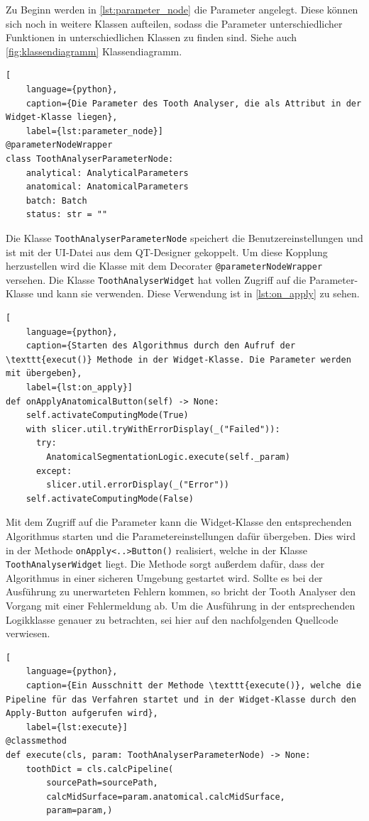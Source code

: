 Zu Beginn werden in \ref{lst:parameter_node} die Parameter angelegt. Diese können
sich noch in weitere Klassen aufteilen, sodass die Parameter unterschiedlicher
Funktionen in unterschiedlichen Klassen zu finden sind. Siehe auch \ref{fig:klassendiagramm}
Klassendiagramm.

\begin{lstlisting}[
    language={python},
    caption={Die Parameter des Tooth Analyser, die als Attribut in der Widget-Klasse liegen},
    label={lst:parameter_node}]
@parameterNodeWrapper
class ToothAnalyserParameterNode:
    analytical: AnalyticalParameters
    anatomical: AnatomicalParameters
    batch: Batch
    status: str = ""
\end{lstlisting}

Die Klasse \texttt{ToothAnalyserParameterNode} speichert die Benutzereinstellungen
und ist mit der \ac{UI}-Datei aus dem QT-Designer gekoppelt. Um diese Kopplung herzustellen
wird die Klasse mit dem Decorater \texttt{@parameterNodeWrapper} versehen. Die Klasse
\texttt{ToothAnalyserWidget} hat vollen Zugriff auf die Parameter-Klasse und
kann sie verwenden. Diese Verwendung ist in \ref{lst:on_apply} zu sehen.

\begin{lstlisting}[
    language={python},
    caption={Starten des Algorithmus durch den Aufruf der \texttt{execut()} Methode in der Widget-Klasse. Die Parameter werden mit übergeben},
    label={lst:on_apply}]
def onApplyAnatomicalButton(self) -> None:
    self.activateComputingMode(True)
    with slicer.util.tryWithErrorDisplay(_("Failed")):
	  try:
	    AnatomicalSegmentationLogic.execute(self._param)
	  except:
	    slicer.util.errorDisplay(_("Error"))
    self.activateComputingMode(False)
\end{lstlisting}

Mit dem Zugriff auf die Parameter kann die Widget-Klasse den entsprechenden
Algorithmus starten und die Parametereinstellungen dafür übergeben. Dies wird in
der Methode \texttt{onApply<..>Button()} realisiert, welche in der Klasse \texttt{ToothAnalyserWidget}
liegt. Die Methode sorgt außerdem dafür, dass der Algorithmus in einer sicheren
Umgebung gestartet wird. Sollte es bei der Ausführung zu unerwarteten Fehlern kommen,
so bricht der Tooth Analyser den Vorgang mit einer Fehlermeldung ab. Um die Ausführung
in der entsprechenden Logikklasse genauer zu betrachten, sei hier auf den
nachfolgenden Quellcode verwiesen.

\pagebreak

\begin{lstlisting}[
    language={python},
    caption={Ein Ausschnitt der Methode \texttt{execute()}, welche die Pipeline für das Verfahren startet und in der Widget-Klasse durch den Apply-Button aufgerufen wird},
    label={lst:execute}]
@classmethod
def execute(cls, param: ToothAnalyserParameterNode) -> None:
    toothDict = cls.calcPipeline(
	    sourcePath=sourcePath,
	    calcMidSurface=param.anatomical.calcMidSurface,
	    param=param,)
\end{lstlisting}

